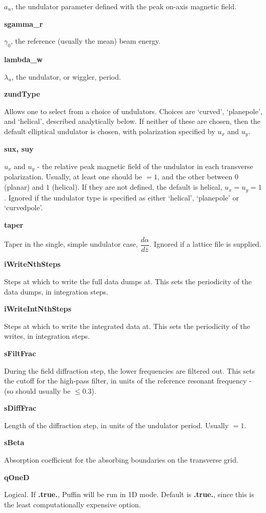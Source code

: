 \documentclass[12pt]{article}%
\begin{document}
$a_u$, the undulator parameter defined with the peak on-axis magnetic field.

{\bf sgamma\_r}

$\gamma_0$, the reference (usually the mean) beam energy.

{\bf lambda\_w}

$\lambda_u$, the undulator, or wiggler, period.

{\bf zundType}

Allows one to select from a choice of undulators. Choices are `curved', `planepole', and `helical', described analytically below. If neither of these are chosen, then the default elliptical undulator is chosen, with polarization specified by $u_x$ and $u_y$.

{\bf sux, suy}

$u_x$ and $u_y$ - the relative peak magnetic field of the undulator in each transverse polarization. Usually, at least one should be $=1$, and the other between $0$ (planar) and $1$ (helical). If they are not defined, the default is helical, $u_x=u_y=1$. Ignored if the undulator type is specified as either `helical', `planepole' or `curvedpole'.

{\bf taper}

Taper in the single, simple undulator case, $\dfrac{d\alpha}{d \bar{z}}$. Ignored if a lattice file is supplied.

{\bf iWriteNthSteps}

Steps at which to write the full data dumps at. This sets the periodicity of the data dumps, in integration steps.

{\bf iWriteIntNthSteps}

Steps at which to write the integrated data at. This sets the periodicity of the writes, in integration steps.

{\bf sFiltFrac}

During the field diffraction step, the lower frequencies are filtered out. This sets the cutoff for the high-pass filter, in units of the reference resonant frequency - (so should usually be $\leq 0.3$).

{\bf sDiffFrac}

Length of the diffraction step, in units of the undulator period. Usually $=1$.

{\bf sBeta}

Absorption coefficient for the absorbing boundaries on the transverse grid.

{\bf qOneD}

Logical. If  {\bf .true.}, Puffin will be run in 1D mode. Default is  {\bf .true.}, since this is the least computationally expensive option.
\end{document}
